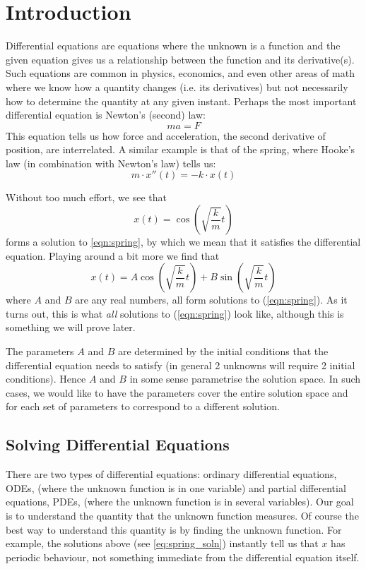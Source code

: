 \section{Introduction}
Differential equations are equations where the unknown is a function and the given equation gives us a relationship between the function and its derivative(s). Such equations are common in physics, economics, and even other areas of math where we know how a quantity changes (i.e. its derivatives) but not necessarily how to determine the quantity at any given instant. Perhaps the most important differential equation is Newton's (second) law:
$$ ma = F $$
This equation tells us how force and acceleration, the second derivative of position, are interrelated. A similar example is that of the spring, where Hooke's law (in combination with Newton's law) tells us:
\begin{equation}\label{eqn:spring}
    m \cdot x''(t) = -k \cdot x(t)
\end{equation}

Without too much effort, we see that
$$ x(t) = \cos\left(\sqrt{\frac{k}{m}}t\right) $$
forms a solution to \eqref{eqn:spring}, by which we mean that it satisfies the differential equation. Playing around a bit more we find that
\begin{equation}\label{eq:spring_soln}
    x(t) = A\cos\left(\sqrt{\frac{k}{m}}t\right) + B\sin\left(\sqrt{\frac{k}{m}}t\right)
\end{equation}
where $A$ and $B$ are any real numbers, all form solutions to (\ref*{eqn:spring}). As it turns out, this is what \textit{all} solutions to (\ref*{eqn:spring}) look like, although this is something we will prove later.

The parameters $A$ and $B$ are determined by the initial conditions that the differential equation needs to satisfy (in general 2 unknowns will require 2 initial conditions). Hence $A$ and $B$ in some sense parametrise the solution space. In such cases, we would like to have the parameters cover the entire solution space and for each set of parameters to correspond to a different solution.

\subsection{Solving Differential Equations}
There are two types of differential equations: ordinary differential equations, ODEs, (where the unknown function is in one variable) and partial differential equations, PDEs, (where the unknown function is in several variables). Our goal is to understand the quantity that the unknown function measures. Of course the best way to understand this quantity is by finding the unknown function. For example, the solutions above (see \autoref{eq:spring_soln}) instantly tell us that $x$ has periodic behaviour, not something immediate from the differential equation itself.

